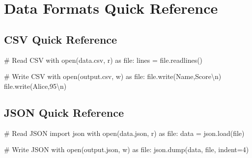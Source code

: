 \documentclass[
  letterpaper,
  DIV=11,
  numbers=noendperiod,
  oneside]{scrreprt}
\newenvironment{Shaded}{}{}
\newcommand{\BuiltInTok}[1]{\textcolor[rgb]{0.84,0.23,0.29}{#1}}
\newcommand{\CharTok}[1]{\textcolor[rgb]{0.01,0.18,0.38}{#1}}
\newcommand{\CommentTok}[1]{\textcolor[rgb]{0.42,0.45,0.49}{#1}}
\newcommand{\ControlFlowTok}[1]{\textcolor[rgb]{0.84,0.23,0.29}{#1}}
\newcommand{\DecValTok}[1]{\textcolor[rgb]{0.00,0.36,0.77}{#1}}
\newcommand{\ImportTok}[1]{\textcolor[rgb]{0.01,0.18,0.38}{#1}}
\newcommand{\NormalTok}[1]{\textcolor[rgb]{0.14,0.16,0.18}{#1}}
\newcommand{\OperatorTok}[1]{\textcolor[rgb]{0.14,0.16,0.18}{#1}}
\newcommand{\StringTok}[1]{\textcolor[rgb]{0.01,0.18,0.38}{#1}}
\begin{document}
\section{Data Formats Quick
Reference}\label{data-formats-quick-reference}

\subsection{CSV Quick Reference}\label{csv-quick-reference}

\begin{Shaded}
\begin{Highlighting}[]
\CommentTok{\# Read CSV}
\ControlFlowTok{with} \BuiltInTok{open}\NormalTok{(}\StringTok{\textquotesingle{}data.csv\textquotesingle{}}\NormalTok{, }\StringTok{\textquotesingle{}r\textquotesingle{}}\NormalTok{) }\ImportTok{as} \BuiltInTok{file}\NormalTok{:}
\NormalTok{    lines }\OperatorTok{=} \BuiltInTok{file}\NormalTok{.readlines()}

\CommentTok{\# Write CSV}
\ControlFlowTok{with} \BuiltInTok{open}\NormalTok{(}\StringTok{\textquotesingle{}output.csv\textquotesingle{}}\NormalTok{, }\StringTok{\textquotesingle{}w\textquotesingle{}}\NormalTok{) }\ImportTok{as} \BuiltInTok{file}\NormalTok{:}
    \BuiltInTok{file}\NormalTok{.write(}\StringTok{\textquotesingle{}Name,Score}\CharTok{\textbackslash{}n}\StringTok{\textquotesingle{}}\NormalTok{)}
    \BuiltInTok{file}\NormalTok{.write(}\StringTok{\textquotesingle{}Alice,95}\CharTok{\textbackslash{}n}\StringTok{\textquotesingle{}}\NormalTok{)}
\end{Highlighting}
\end{Shaded}

\subsection{JSON Quick Reference}\label{json-quick-reference}

\begin{Shaded}
\begin{Highlighting}[]
\CommentTok{\# Read JSON}
\ImportTok{import}\NormalTok{ json}
\ControlFlowTok{with} \BuiltInTok{open}\NormalTok{(}\StringTok{\textquotesingle{}data.json\textquotesingle{}}\NormalTok{, }\StringTok{\textquotesingle{}r\textquotesingle{}}\NormalTok{) }\ImportTok{as} \BuiltInTok{file}\NormalTok{:}
\NormalTok{    data }\OperatorTok{=}\NormalTok{ json.load(}\BuiltInTok{file}\NormalTok{)}

\CommentTok{\# Write JSON}
\ControlFlowTok{with} \BuiltInTok{open}\NormalTok{(}\StringTok{\textquotesingle{}output.json\textquotesingle{}}\NormalTok{, }\StringTok{\textquotesingle{}w\textquotesingle{}}\NormalTok{) }\ImportTok{as} \BuiltInTok{file}\NormalTok{:}
\NormalTok{    json.dump(data, }\BuiltInTok{file}\NormalTok{, indent}\OperatorTok{=}\DecValTok{4}\NormalTok{)}
\end{Highlighting}
\end{Shaded}
\end{document}
